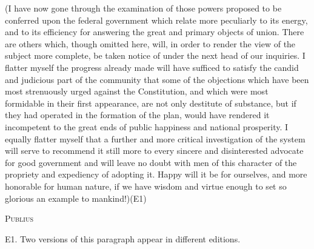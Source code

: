 (I have now gone through the examination of those powers proposed to be conferred upon the federal government which relate more peculiarly to its energy, and to its efficiency for answering the great and primary objects of union. 
There are others which, though omitted here, will, in order to render the view of the subject more complete, be taken notice of under the next head of our inquiries. 
I flatter myself the progress already made will have sufficed to satisfy the candid and judicious part of the community that some of the objections which have been most strenuously urged against the Constitution, and which were most formidable in their first appearance, are not only destitute of substance, but if they had operated in the formation of the plan, would have rendered it incompetent to the great ends of public happiness and national prosperity. 
I equally flatter myself that a further and more critical investigation of the system will serve to recommend it still more to every sincere and disinterested advocate for good government and will leave no doubt with men of this character of the propriety and expediency of adopting it. 
Happy will it be for ourselves, and more honorable for human nature, if we have wisdom and virtue enough to set so glorious an example to mankind!)(E1)

\vspace{.5cm}
\textsc{Publius}

\vspace{1.5cm}

E1. 
Two versions of this paragraph appear in different editions.

